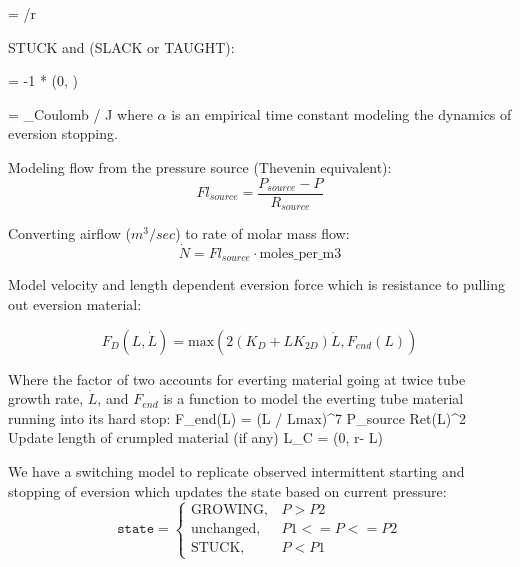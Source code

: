 \documentclass[letterpaper]{article}
\begin{document}
\beq
\ddot{\theta} = /r
\eeq

STUCK and (SLACK or TAUGHT):



\beq
{} = -1 * (0, \alpha * )
\eeq

\beq
\ddot{\theta} = \tau_{Coulomb} / J
\eeq
where $\alpha$ is an empirical time constant modeling the dynamics of eversion stopping.

Modeling flow from the pressure source (Thevenin equivalent):
\begin{equation}\label{eqOneCompartmentflow}
Fl_{source} = \frac {P_{source}-P} {R_{source}}
\end{equation}

Converting airflow ($m^3/sec$) to rate of molar mass flow:
\begin{equation}\label{eqOneCompartmentNdot}
\dot{N} = Fl_{source} \cdot \mathrm{moles\_per\_m3}
\end{equation}

Model velocity and length dependent eversion force which is resistance to pulling out eversion material:

\begin{equation}
F_D(L,\dot{L}) = \mathrm{max} \left( 2  (  K_{D} + L  K_{2D} ) \dot{L} , F_{end} (L)  \right )
\end{equation}

Where the factor of two accounts for everting material going at twice tube growth rate, $\dot{L}$,
and $F_{end}$ is a function to model the everting tube material running into its hard stop:
\beq
F_{end}(L) = (L / Lmax)^7  P_{source} \pi Ret(L)^2
\eeq
Update length of  crumpled material (if any)
\beq
L_C = (0,  r\theta - L)
\eeq

We have a switching model to replicate observed intermittent starting and stopping of eversion
which updates the state based on current pressure:
\begin{equation}
    \mathtt{state} =
    \begin{cases}
      \mathrm{GROWING}, &  P > P2 \\
      \mathrm{unchanged}, & P1 <= P <= P2 \\
      \mathrm{STUCK},   &  P < P1
    \end{cases}
\end{equation}
\end{document}
